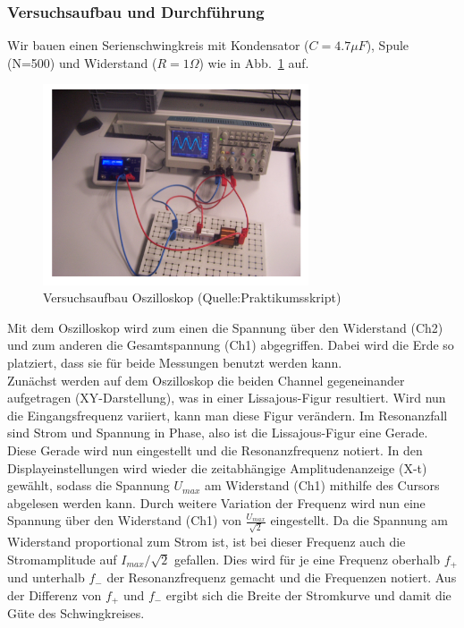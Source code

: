 \documentclass[12pt,a4paper]{article}
\begin{document}
\subsubsection{Versuchsaufbau und Durchführung}
Wir bauen einen Serienschwingkreis mit Kondensator ($C=4.7\mu F$), Spule (N=500) und Widerstand ($R=1\Omega$) wie in Abb.~\ref{Aufbau_Oszilloskop} auf.
\begin{figure}[H]
	\centering
	\includegraphics[width=0.7\textwidth]{Daten/Aufbau_Oszilloskop.png}
	\caption{Versuchsaufbau Oszilloskop (Quelle:Praktikumsskript)}
	\label{Aufbau_Oszilloskop}
\end{figure}
Mit dem Oszilloskop wird zum einen die Spannung über den Widerstand (Ch2) und zum anderen die Gesamtspannung (Ch1) abgegriffen. Dabei wird die Erde so platziert, dass sie für beide Messungen benutzt werden kann.\\
Zunächst werden auf dem Oszilloskop die beiden Channel gegeneinander aufgetragen (XY-Darstellung), was in einer Lissajous-Figur resultiert. Wird nun die Eingangsfrequenz variiert, kann man diese Figur verändern. Im Resonanzfall sind Strom und Spannung in Phase, also ist die Lissajous-Figur eine Gerade. Diese Gerade wird nun eingestellt und die Resonanzfrequenz notiert. In den Displayeinstellungen wird wieder die zeitabhängige Amplitudenanzeige (X-t) gewählt, sodass die Spannung $U_{max}$ am Widerstand (Ch1) mithilfe des Cursors abgelesen werden kann. Durch weitere Variation der Frequenz wird nun eine Spannung über den Widerstand (Ch1) von $\frac{U_{max}}{\sqrt{2}}$ eingestellt. Da die Spannung am Widerstand proportional zum Strom ist, ist bei dieser Frequenz auch die Stromamplitude auf $I_{max}/\sqrt{2}$ gefallen. Dies wird für je eine Frequenz oberhalb $f_+$ und unterhalb $f_-$ der Resonanzfrequenz gemacht und die Frequenzen notiert. Aus der Differenz von $f_+$ und $f_-$ ergibt sich die Breite der Stromkurve und damit die Güte des Schwingkreises.
\end{document}
